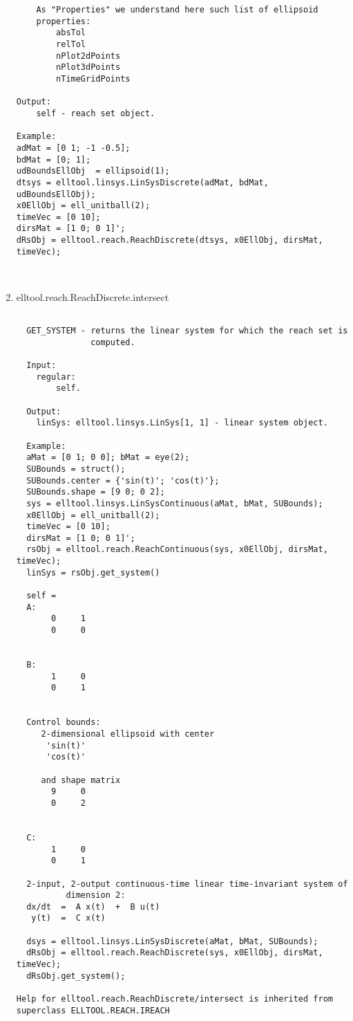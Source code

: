 \begin{enumerate}
\begin{lstlisting}
    As "Properties" we understand here such list of ellipsoid
    properties:
        absTol
        relTol
        nPlot2dPoints
        nPlot3dPoints
        nTimeGridPoints

Output:
    self - reach set object.

Example:
adMat = [0 1; -1 -0.5];
bdMat = [0; 1];
udBoundsEllObj  = ellipsoid(1);
dtsys = elltool.linsys.LinSysDiscrete(adMat, bdMat, udBoundsEllObj);
x0EllObj = ell_unitball(2);
timeVec = [0 10];
dirsMat = [1 0; 0 1]';
dRsObj = elltool.reach.ReachDiscrete(dtsys, x0EllObj, dirsMat, timeVec);



\end{lstlisting}
\fontfamily{\familydefault}
\selectfont
\item {elltool.reach.ReachDiscrete.intersect}
\selectfont
\begin{lstlisting}

  GET_SYSTEM - returns the linear system for which the reach set is
               computed.

  Input:
    regular:
        self.

  Output:
    linSys: elltool.linsys.LinSys[1, 1] - linear system object.

  Example:
  aMat = [0 1; 0 0]; bMat = eye(2);
  SUBounds = struct();
  SUBounds.center = {'sin(t)'; 'cos(t)'};
  SUBounds.shape = [9 0; 0 2];
  sys = elltool.linsys.LinSysContinuous(aMat, bMat, SUBounds);
  x0EllObj = ell_unitball(2);
  timeVec = [0 10];
  dirsMat = [1 0; 0 1]';
  rsObj = elltool.reach.ReachContinuous(sys, x0EllObj, dirsMat, timeVec);
  linSys = rsObj.get_system()

  self =
  A:
       0     1
       0     0


  B:
       1     0
       0     1


  Control bounds:
     2-dimensional ellipsoid with center
      'sin(t)'
      'cos(t)'

     and shape matrix
       9     0
       0     2


  C:
       1     0
       0     1

  2-input, 2-output continuous-time linear time-invariant system of
          dimension 2:
  dx/dt  =  A x(t)  +  B u(t)
   y(t)  =  C x(t)

  dsys = elltool.linsys.LinSysDiscrete(aMat, bMat, SUBounds);
  dRsObj = elltool.reach.ReachDiscrete(sys, x0EllObj, dirsMat, timeVec);
  dRsObj.get_system();

Help for elltool.reach.ReachDiscrete/intersect is inherited from superclass ELLTOOL.REACH.IREACH




\end{lstlisting}
\end{enumerate}
